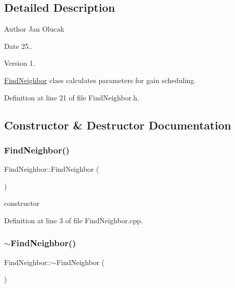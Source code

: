 \subsection{Detailed Description}
\begin{DoxyAuthor}{Author}
Jan Olucak 
\end{DoxyAuthor}
\begin{DoxyDate}{Date}
25.. 
\end{DoxyDate}
\begin{DoxyVersion}{Version}
1.
\end{DoxyVersion}
\hyperlink{class_find_neighbor}{Find\+Neighbor} class calculates parameters for gain scheduling. 

Definition at line 21 of file Find\+Neighbor.\+h.



\subsection{Constructor \& Destructor Documentation}
\mbox{\label{class_find_neighbor_a6cea2007d84dfd0f58abb178c9407326}} 
\subsubsection{\texorpdfstring{Find\+Neighbor()}{FindNeighbor()}}
{\footnotesize\ttfamily Find\+Neighbor\+::\+Find\+Neighbor (\begin{DoxyParamCaption}{ }\end{DoxyParamCaption})}



constructor 



Definition at line 3 of file Find\+Neighbor.\+cpp.

\mbox{\label{class_find_neighbor_ab137730242367d03b09da870e3537192}} 
\subsubsection{\texorpdfstring{$\sim$\+Find\+Neighbor()}{~FindNeighbor()}}
{\footnotesize\ttfamily Find\+Neighbor\+::$\sim$\+Find\+Neighbor (\begin{DoxyParamCaption}{ }\end{DoxyParamCaption})}



